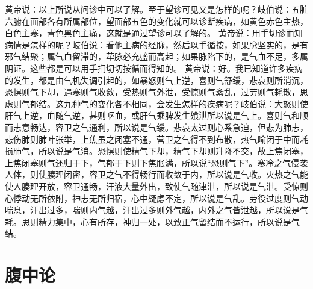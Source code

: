 \documentclass[12pt,UTF8]{ctexbook}
\begin{document}
黄帝说：以上所说从问诊中可以了解。至于望诊可见又是怎样的呢？岐伯说：五脏六腑在面部各有所属部位，望面部五色的变化就可以诊断疾病，如黄色赤色主热，白色主寒，青色黑色主痛，这就是通过望诊可以了解的。
黄帝说：用手切诊而知病情是怎样的呢？岐伯说：看他主病的经脉，然后以手循按，如果脉坚实的，是有邪气结聚；属气血留滞的，荦脉必充盛而高起；如果脉陷下的，是气血不足，多属阴证。这些都是可以用手扪切切按循而得知的。
黄帝说：好。我已知道许多疾病的发生，都是由气机失调引起的，如暴怒则气上逆，喜则气舒缓，悲哀则所消沉，恐惧则气下却，遇寒则气收敛，受热则气外泄，受惊则气紊乱，过劳则气耗散，思虑则气郁结。这九种气的变化各不相同，会发生怎样的疾病呢？岐伯说：大怒则使肝气上逆，血随气逆，甚则呕血，或肝气乘脾发生飧泄所以说是气上。喜则气和顺而志意畅达，容卫之气通利，所以说是气缓。悲哀太过则心系急迫，但悲为肺志，悲伤肺则肺叶张举，上焦虽之闭塞不通，营卫之气得不到布散，热气喻闭于中而耗损肺气，所以说是气消。恐惧则使精气下却，精气下却则升降不交，故上焦闭塞，上焦闭塞则气还归于下，气郁于下则下焦胀满，所以说“恐则气下”。寒冷之气侵袭人体，则使腠理闭密，容卫之气不得畅行而收敛于内，所以说是气收。火热之气能使人腠理开放，容卫通畅，汗液大量外出，致使气随津泄，所以说是气泄。受惊则心悸动无所依附，神志无所归宿，心中疑虑不定，所以说是气乱。劳役过度则气动喘息，汗出过多，喘则内气越，汗出过多则外气越，内外之气皆泄越，所以说是气耗。思则精力集中，心有所存，神归一处，以致正气留结而不运行，所以说是气结。

\chapter{腹中论}
\end{document}
